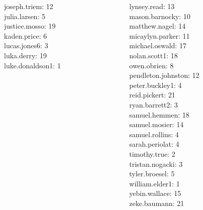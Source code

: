 \documentclass[10pt]{beamer}
\begin{document}
\begin{frame}
\begin{columns}
\begin{column}{0.33\textwidth}
joseph.triem: 12 \\ 
julia.larsen: 5 \\ 
justice.mosso: 19 \\ 
kaden.price: 6 \\ 
lucas.jones6: 3 \\ 
luka.derry: 19 \\ 
luke.donaldson1: 1 \\\end{column}
\begin{column}{0.33\textwidth}
lynsey.read: 13 \\ 
mason.barnocky: 10 \\ 
matthew.nagel: 14 \\ 
micaylyn.parker: 11 \\ 
michael.oswald: 17 \\ 
nolan.scott1: 18 \\ 
owen.obrien: 8 \\ 
pendleton.johnston: 12 \\ 
peter.buckley1: 4 \\ 
reid.pickert: 21 \\ 
ryan.barrett2: 3 \\ 
samuel.hemmen: 18 \\ 
samuel.mosier: 14 \\ 
samuel.rollins: 4 \\ 
sarah.periolat: 4 \\ 
timothy.true: 2 \\ 
tristan.nogacki: 3 \\ 
tyler.broesel: 5 \\ 
william.elder1: 1 \\ 
yebin.wallace: 15 \\ 
zeke.baumann: 21 \\\end{column}
\end{columns}
\vfill
\end{frame}
\end{document}
